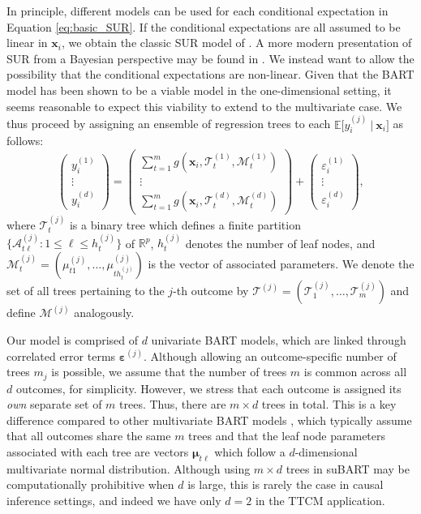 \documentclass[aoas,preprint]{imsart}
\newcommand\given[1][]{\:#1\vert\:}
\theoremstyle{plain}
\theoremstyle{definition}
\theoremstyle{remark}
\begin{document}
In principle, different models can be used for each conditional expectation in Equation \eqref{eq:basic_SUR}. If the conditional expectations are all assumed to be linear in $\mathbf{x}_i$, we obtain the classic SUR model of \citet{zellner1962efficient}. A more modern presentation of SUR from a Bayesian perspective may be found in
 \citet[Chapter~9]{greenberg2012introduction}.
We instead want to allow the possibility that the conditional expectations are non-linear. Given that the BART model has been shown to be a viable model in the one-dimensional setting, it seems reasonable to expect this viability to extend to the multivariate case. We thus proceed by assigning an ensemble of regression trees to each $\mathbb{E}\lbrack y_i^{(j)}\given \mathbf{x}_i\rbrack$ as follows:
\begin{equation}
\begin{pmatrix}  y_i^{(1)} \\ \vdots \\ y_i^{(d)} \end{pmatrix} = 
\begin{pmatrix} 
\sum_{t=1}^{m}g\left(\mathbf{x}_i, \mathcal{T}^{(1)}_t, \mathcal{M}^{(1)}_t\right) \\  \vdots \\
\sum_{t=1}^{m}g\left(\mathbf{x}_i, \mathcal{T}^{(d)}_t, \mathcal{M}^{(d)}_t\right)
\end{pmatrix} + 
\begin{pmatrix}  \varepsilon_i^{(1)} \\ \vdots \\ \varepsilon_i^{(d)} \end{pmatrix},
\label{eq:basic_suBART}
\end{equation}
where $\mathcal{T}^{(j)}_{t}$ is a binary tree which defines a finite partition $\{\mathcal{A}^{(j)}_{t\ell}: 1 \leq \ell \leq h^{(j)}_t\}$ of $\mathbb{R}^p$, $h^{(j)}_t$ denotes the number of leaf nodes, and $\mathcal{M}^{(j)}_t = (\mu^{(j)}_{t1},\ldots,\mu^{(j)}_{th^{(j)}_{t}})$ is the vector of associated parameters. We denote the set of all trees pertaining to the $j$-th outcome by $\boldsymbol{\mathcal{T}}^{(j)} = (\mathcal{T}_{1}^{(j)},\dots, \mathcal{T}_{m}^{(j)})$ and define $\boldsymbol{\mathcal{M}}^{(j)}$ analogously. 

Our model is comprised of $d$ univariate BART models, which are linked through correlated error terms $\boldsymbol{\varepsilon}^{(j)}$. Although allowing an outcome-specific number of trees $m_j$ is possible, we assume that the number of trees $m$ is common across all $d$ outcomes, for simplicity. However, we stress that each outcome is assigned its \textit{own} separate set of $m$ trees. Thus, there are $m\times d$ trees in total. This is a key difference compared to other multivariate BART models \citep{um2023bayesian,mcjames2024bayesian}, which typically assume that all outcomes share the same $m$ trees and that the leaf node parameters associated with each tree are vectors $\boldsymbol{\mu}_{t\ell}$ which follow a $d$-dimensional multivariate normal distribution. Although using $m \times d$ trees in suBART may be computationally prohibitive when $d$ is large, this is rarely the case in causal inference settings, and indeed we have only $d=2$ in the TTCM application.
\end{document}
